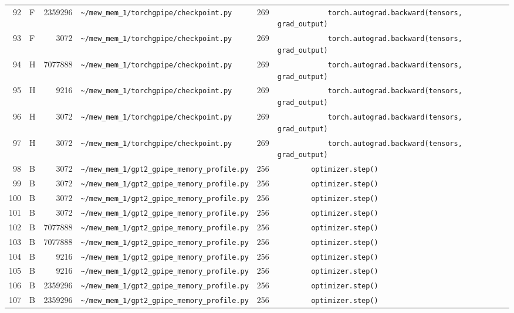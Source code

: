 \documentclass{article}
\begin{document}
\begin{longtable}{r l r p{6.5cm} r p{7.0cm}}
92 & F & 2359296 & \lstinline|~/mew_mem_1/torchgpipe/checkpoint.py| & 269 & \lstinline|            torch.autograd.backward(tensors, grad_output)| \\
93 & F & 3072 & \lstinline|~/mew_mem_1/torchgpipe/checkpoint.py| & 269 & \lstinline|            torch.autograd.backward(tensors, grad_output)| \\
94 & H & 7077888 & \lstinline|~/mew_mem_1/torchgpipe/checkpoint.py| & 269 & \lstinline|            torch.autograd.backward(tensors, grad_output)| \\
95 & H & 9216 & \lstinline|~/mew_mem_1/torchgpipe/checkpoint.py| & 269 & \lstinline|            torch.autograd.backward(tensors, grad_output)| \\
96 & H & 3072 & \lstinline|~/mew_mem_1/torchgpipe/checkpoint.py| & 269 & \lstinline|            torch.autograd.backward(tensors, grad_output)| \\
97 & H & 3072 & \lstinline|~/mew_mem_1/torchgpipe/checkpoint.py| & 269 & \lstinline|            torch.autograd.backward(tensors, grad_output)| \\
98 & B & 3072 & \lstinline|~/mew_mem_1/gpt2_gpipe_memory_profile.py| & 256 & \lstinline|        optimizer.step()| \\
99 & B & 3072 & \lstinline|~/mew_mem_1/gpt2_gpipe_memory_profile.py| & 256 & \lstinline|        optimizer.step()| \\
100 & B & 3072 & \lstinline|~/mew_mem_1/gpt2_gpipe_memory_profile.py| & 256 & \lstinline|        optimizer.step()| \\
101 & B & 3072 & \lstinline|~/mew_mem_1/gpt2_gpipe_memory_profile.py| & 256 & \lstinline|        optimizer.step()| \\
102 & B & 7077888 & \lstinline|~/mew_mem_1/gpt2_gpipe_memory_profile.py| & 256 & \lstinline|        optimizer.step()| \\
103 & B & 7077888 & \lstinline|~/mew_mem_1/gpt2_gpipe_memory_profile.py| & 256 & \lstinline|        optimizer.step()| \\
104 & B & 9216 & \lstinline|~/mew_mem_1/gpt2_gpipe_memory_profile.py| & 256 & \lstinline|        optimizer.step()| \\
105 & B & 9216 & \lstinline|~/mew_mem_1/gpt2_gpipe_memory_profile.py| & 256 & \lstinline|        optimizer.step()| \\
106 & B & 2359296 & \lstinline|~/mew_mem_1/gpt2_gpipe_memory_profile.py| & 256 & \lstinline|        optimizer.step()| \\
107 & B & 2359296 & \lstinline|~/mew_mem_1/gpt2_gpipe_memory_profile.py| & 256 & \lstinline|        optimizer.step()| \\

\end{longtable}
\end{document}
